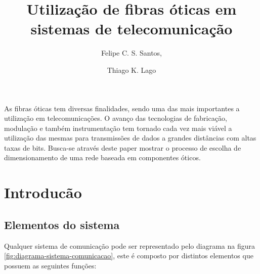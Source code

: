 \documentclass[article]{IEEEtran}
\begin{document}
%
\title{Utilização de fibras óticas em sistemas de telecomunicação}




\author{
	Felipe C. S. Santos,
	\and
	Thiago K. Lago
	
}






\maketitle

\IEEEdisplaynontitleabstractindextext
As fibras óticas tem diversas finalidades, sendo uma das mais importantes a utilização em telecomunicações. O avanço das tecnologias de fabricação, modulação e também instrumentação tem tornado cada vez mais viável a utilização das mesmas para transmissões de dados a grandes distâncias com altas taxas de bits. Busca-se através deste paper mostrar o processo de escolha de dimensionamento de uma rede baseada em componentes óticos.
\IEEEpeerreviewmaketitle



\section{Introducão}
\subsection{Elementos do sistema}
\par Qualquer sistema de comunicação pode ser representado pelo diagrama na figura \ref{fig:diagrama-sistema-comunicacao}, este é composto por distintos elementos que possuem as seguintes funções: 
\end{document}
